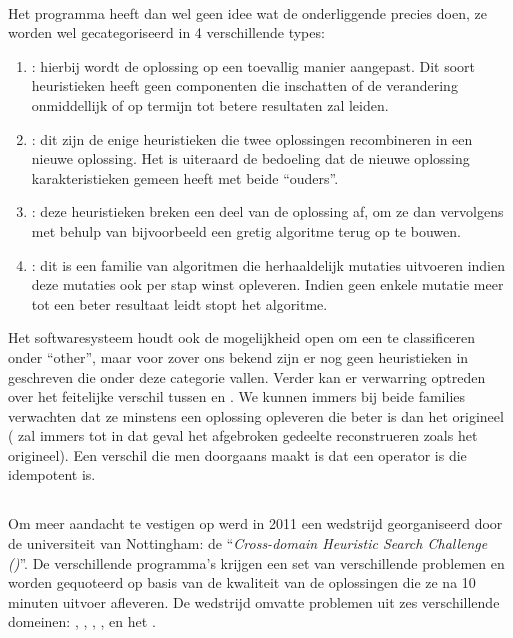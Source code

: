 \paragraph{}
Het programma heeft dan wel geen idee wat de onderliggende \abllhn{} precies doen, ze worden wel gecategoriseerd in 4 verschillende types:
\begin{enumerate}
 \item \abmt{}: hierbij wordt de oplossing op een toevallig manier aangepast. Dit soort heuristieken heeft geen componenten die inschatten of de verandering onmiddellijk of op termijn tot betere resultaten zal leiden.
 \item \abco{}: dit zijn de enige heuristieken die twee oplossingen recombineren in een nieuwe oplossing. Het is uiteraard de bedoeling dat de nieuwe oplossing karakteristieken gemeen heeft met beide ``ouders''.
 \item \abrr{}: deze heuristieken breken een deel van de oplossing af, om ze dan vervolgens met behulp van bijvoorbeeld een gretig algoritme terug op te bouwen.
 \item \abls{}: dit is een familie van algoritmen die herhaaldelijk mutaties uitvoeren indien deze mutaties ook per stap winst opleveren. Indien geen enkele mutatie meer tot een beter resultaat leidt stopt het algoritme.
\end{enumerate}
Het softwaresysteem houdt ook de mogelijkheid open om een \abllh{} te classificeren onder ``other'', maar voor zover ons bekend zijn er nog geen heuristieken in \abhf{} geschreven die onder deze categorie vallen. Verder kan er verwarring optreden over het feitelijke verschil tussen \abrr{} en \abls{}. We kunnen immers bij beide families verwachten dat ze minstens een oplossing opleveren die beter is dan het origineel (\abrr{} zal immers tot in dat geval het afgebroken gedeelte reconstrueren zoals het origineel). Een verschil die men doorgaans maakt is dat \abls{} een operator is die idempotent is.

\subsection{\abchescy{}}

Om meer aandacht te vestigen op \abhf{} werd in 2011 een wedstrijd georganiseerd door de universiteit van Nottingham: de ``\emph{Cross-domain Heuristic Search Challenge (\abchescy)}''. De verschillende programma's krijgen een set van verschillende problemen en worden gequoteerd op basis van de kwaliteit van de oplossingen die ze na 10 minuten uitvoer afleveren.%
De wedstrijd omvatte problemen uit zes verschillende domeinen: , , , ,  en het .

